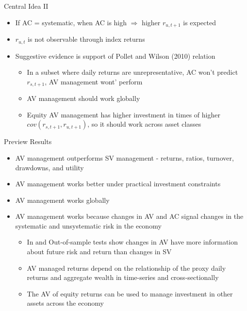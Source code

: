 \documentclass[handout]{beamer}
\begin{document}
\begin{frame}{Central Idea II}
	\begin{itemize}[<+->]
		\item If AC = systematic, when AC is high $\Rightarrow$ higher $r_{u,t+1}$ is expected
		\item $r_{u,t}$ is not observable through index returns
		\item Suggestive evidence is support of Pollet and Wilson (2010) relation
		\begin{itemize}[<+->]
			\item In a subset where daily returns are unrepresentative, AC won't predict $r_{s,t+1}$, AV management wont' perform
			\item AV management should work globally
			\item Equity AV management has higher investment in times of higher $cov(r_{s,t+1},r_{u,t+1})$, so it should work across asset classes
		\end{itemize}
	\end{itemize}
\end{frame}

\begin{frame}{Preview Results}
	\begin{itemize}[<+->]
		\item AV management outperforms SV management - returns, ratios, turnover, drawdowns, and utility
		\item AV management works better under practical investment constraints
		\item AV management works globally
		\item AV management works because changes in AV and AC signal changes in the systematic and unsystematic risk in the economy
		\begin{itemize}[<+->]
			\item In and Out-of-sample tests show changes in AV have more information about future risk and return than changes in SV
			\item AV managed returns depend on the relationship of the proxy daily returns and aggregate wealth in time-series and cross-sectionally
			\item The AV of equity returns can be used to manage investment in other assets across the economy
		\end{itemize}
		
	\end{itemize}
\end{frame}
\end{document}
